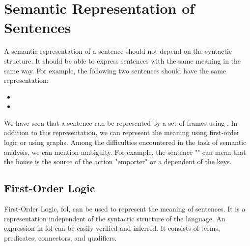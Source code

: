 \documentclass{KBook}
\begin{document}
\section{Semantic Representation of Sentences}

A semantic representation of a sentence should not depend on the syntactic structure. It should be able to express sentences with the same meaning in the same way. For example, the following two sentences should have the same representation:
\begin{itemize}
	\item {}
	\item {}
\end{itemize}

We have seen that a sentence can be represented by a set of frames using . In addition to this representation, we can represent the meaning using first-order logic or using graphs. Among the difficulties encountered in the task of semantic analysis, we can mention ambiguity. For example, the sentence "" can mean that the house is the source of the action "emporter" or a dependent of the keys.


\subsection{First-Order Logic}

First-Order Logic, \ac{fol}, can be used to represent the meaning of sentences.
It is a representation independent of the syntactic structure of the language.
An expression in \ac{fol} can be easily verified and inferred.
It consists of terms, predicates, connectors, and qualifiers.
\end{document}
